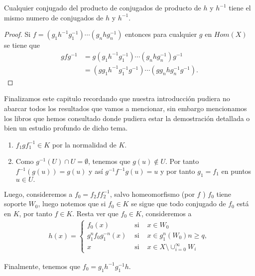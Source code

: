 \begin{ob}
Cualquier conjugado del producto de conjugados de producto de $h$ y $h^{-1}$ tiene el mismo numero de conjugados de $h$ y $h^{-1}$.
\end{ob}	 

\begin{proof}
Si $f=(g_1 h^{-1} g_1^{-1}) \cdots(g_n h g_n^{-1})$ entonces para cualquier $g$ en $Hom(X)$ se tiene que
\begin{align*}
g f g^{-1} & = g(g_1 h^{-1} g_1^{-1}) \cdots (g_n h g_n^{-1})g^{-1}\\
&= (gg_1 h^{-1} g_1^{-1}g^{-1})\cdots(gg_n h g_n^{-1}g^{-1}).
\end{align*} 
\end{proof} 

Finalizamos este capitulo recordando que nuestra introducción pudiera no abarcar todos los resultados que vamos a mencionar, sin embargo mencionamos los libros que hemos consultado donde pudiera  estar la demostración detallada  o bien un estudio profundo de dicho tema. \cite{Baz}



 


 \begin{ob}
 \begin{enumerate}
 \item  $f_1gf_1^{-1} \in K$ por la normalidad de $K$.
 \item Como $g^{-1}(U)\cap U= \emptyset$, tenemos que $g(u) \not \in U.$ Por tanto $f^{-1}(g(u))=g(u)$ y así $g^{-1}f^{-1}g(u)=u$ y por tanto $g_1=f_1$ en puntos $u \in U.$
 \end{enumerate}
 \end{ob}

 Luego, consideremos a $f_0=f_2ff_2^{-1}$, salvo homeomorfismo (por $f$ ) $f_0$ tiene soporte $W_0$, luego notemos que si $f_0 \in K$ se sigue que todo conjugado de $f_0$ está en $K$, por tanto $f \in K.$ Resta ver que $f_0 \in K$, consideremos a
 \begin{align*}
 h(x)=\left\lbrace \begin{array}{ccc}
 f_0(x)& \text{ si } & x \in W_0 \\
 g^{n}_1f_0g_1^{-n}(x) & \text{ si }& x \in g_1^{n}(W_0)  n \geq q,\\
x & \text{ si } & x \in X \setminus \cup_{i=0 }^\infty W_i
\end{array}   \right.
\end{align*}

Finalmente, tenemos que $f_0=g_1h^{-1}g_1^{-1}h$.
